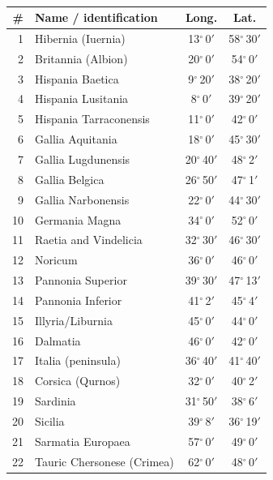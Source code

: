 \documentclass[10pt,a4paper]{article}
\begin{document}
\\[2pt]
\begin{longtable}{r >{\raggedright\arraybackslash}p{8.5cm} c c}
\toprule \# & Name / identification & Long. & Lat.\\ \midrule\endhead
1 & Hibernia (Iuernia) & 13$^\circ$\,0$'$ & 58$^\circ$\,30$'$\\
2 & Britannia (Albion) & 20$^\circ$\,0$'$ & 54$^\circ$\,0$'$\\
3 & Hispania Baetica & 9$^\circ$\,20$'$ & 38$^\circ$\,20$'$\\
4 & Hispania Lusitania & 8$^\circ$\,0$'$ & 39$^\circ$\,20$'$\\
5 & Hispania Tarraconensis & 11$^\circ$\,0$'$ & 42$^\circ$\,0$'$\\
6 & Gallia Aquitania & 18$^\circ$\,0$'$ & 45$^\circ$\,30$'$\\
7 & Gallia Lugdunensis & 20$^\circ$\,40$'$ & 48$^\circ$\,2$'$\\
8 & Gallia Belgica & 26$^\circ$\,50$'$ & 47$^\circ$\,1$'$\\
9 & Gallia Narbonensis & 22$^\circ$\,0$'$ & 44$^\circ$\,30$'$\\
10 & Germania Magna & 34$^\circ$\,0$'$ & 52$^\circ$\,0$'$\\
11 & Raetia and Vindelicia & 32$^\circ$\,30$'$ & 46$^\circ$\,30$'$\\
12 & Noricum & 36$^\circ$\,0$'$ & 46$^\circ$\,0$'$\\
13 & Pannonia Superior & 39$^\circ$\,30$'$ & 47$^\circ$\,13$'$\\
14 & Pannonia Inferior & 41$^\circ$\,2$'$ & 45$^\circ$\,4$'$\\
15 & Illyria/Liburnia & 45$^\circ$\,0$'$ & 44$^\circ$\,0$'$\\
16 & Dalmatia & 46$^\circ$\,0$'$ & 42$^\circ$\,0$'$\\
17 & Italia (peninsula) & 36$^\circ$\,40$'$ & 41$^\circ$\,40$'$\\
18 & Corsica (Qurnos) & 32$^\circ$\,0$'$ & 40$^\circ$\,2$'$\\
19 & Sardinia & 31$^\circ$\,50$'$ & 38$^\circ$\,6$'$\\
20 & Sicilia & 39$^\circ$\,8$'$ & 36$^\circ$\,19$'$\\
21 & Sarmatia Europaea & 57$^\circ$\,0$'$ & 49$^\circ$\,0$'$\\
22 & Tauric Chersonese (Crimea) & 62$^\circ$\,0$'$ & 48$^\circ$\,0$'$\\

\end{longtable}
\end{document}
